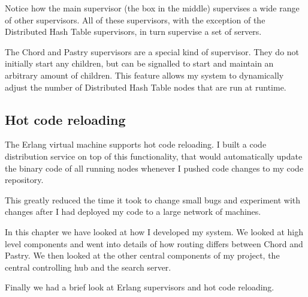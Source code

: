 Notice how the main supervisor (the box in the middle) supervises a wide range of other supervisors. All of these supervisors, with the exception of the Distributed Hash Table supervisors, in turn supervise a set of servers.

The Chord and Pastry supervisors are a special kind of supervisor. They do not initially start any children, but can be signalled to start and maintain an arbitrary amount of children. This feature allows my system to dynamically adjust the number of Distributed Hash Table nodes that are run at runtime.


\subsection{Hot code reloading}
The Erlang virtual machine supports hot code reloading.
I built a code distribution service on top of this functionality, that would automatically update the binary code of all running nodes whenever I pushed code changes to my code repository.

This greatly reduced the time it took to change small bugs and experiment with changes after I had deployed my code to a large network of machines.

\mbox{}

In this chapter we have looked at how I developed my system. We looked at high level components and went into details of how routing differs between Chord and Pastry. We then looked at the other central components of my project, the central controlling hub and the search server.

Finally we had a brief look at Erlang supervisors and hot code reloading.
